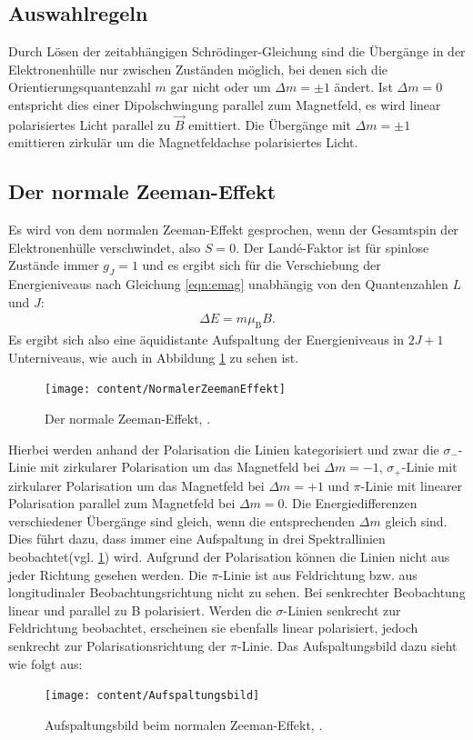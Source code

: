 \documentclass{article}
\begin{document}
	\subsection{Auswahlregeln}
	Durch Lösen der zeitabhängigen Schrödinger-Gleichung sind die Übergänge in der Elektronenhülle nur zwischen Zuständen möglich, bei denen sich die Orientierungsquantenzahl $m$ gar nicht oder um $\Delta m = \pm 1$ ändert. Ist $\Delta m = 0$ entspricht dies einer Dipolschwingung parallel zum Magnetfeld, es wird linear polarisiertes Licht parallel zu $\vec{B}$ emittiert. Die Übergänge mit $\Delta m = \pm 1$ emittieren zirkulär um die Magnetfeldachse polarisiertes Licht.
	
	\subsection{Der normale Zeeman-Effekt}
	Es wird von dem normalen Zeeman-Effekt gesprochen, wenn der Gesamtspin der Elektronenhülle verschwindet, also $S = 0$. Der Landé-Faktor ist für spinlose Zustände immer $g_J = 1$ und es ergibt sich für die Verschiebung der Energieniveaus nach Gleichung \ref{eqn:emag} unabhängig von den Quantenzahlen $L$ und $J$:
	\begin{align}
	\Delta E=m\mu_\text{B}B.
	\end{align}
	Es ergibt sich also eine äquidistante Aufspaltung der Energieniveaus in $2J+1$ Unterniveaus, wie auch in Abbildung \ref{fig:normalerzeemaneffekt} zu sehen ist.
	\begin{figure}[h!]
		\centering
		\texttt{[image: content/NormalerZeemanEffekt]}
		\caption{Der normale Zeeman-Effekt, \cite[10]{anleitungV27}.}
		\label{fig:normalerzeemaneffekt}
	\end{figure}
	Hierbei werden anhand der Polarisation die Linien kategorisiert und zwar die $\sigma_-$-Linie mit zirkularer Polarisation um das Magnetfeld bei $\Delta m = -1$, $\sigma_+$-Linie mit zirkularer Polarisation um das Magnetfeld bei $\Delta m = +1$ und $\pi$-Linie mit linearer Polarisation parallel zum Magnetfeld bei $\Delta m = 0$. Die Energiedifferenzen verschiedener Übergänge sind gleich, wenn die entsprechenden $\Delta m$ gleich sind. Dies führt dazu, dass immer eine Aufspaltung in drei Spektrallinien beobachtet(vgl. \ref{fig:normalerzeemaneffekt}) wird.
	Aufgrund der Polarisation können die Linien nicht aus jeder Richtung gesehen werden. Die $\pi$-Linie ist aus Feldrichtung bzw. aus longitudinaler Beobachtungsrichtung nicht zu sehen. Bei senkrechter Beobachtung linear und parallel zu B polarisiert. Werden die $\sigma$-Linien senkrecht zur Feldrichtung beobachtet, erscheinen sie ebenfalls linear polarisiert, jedoch senkrecht zur Polarisationsrichtung der $\pi$-Linie. Das Aufspaltungsbild dazu sieht wie folgt aus:
	\begin{figure}[h!]
		\centering
		\texttt{[image: content/Aufspaltungsbild]}
		\caption{Aufspaltungsbild beim normalen Zeeman-Effekt, \cite[10]{anleitungV27}.}
		\label{fig:aufspaltungsbild}
	\end{figure}
\end{document}
